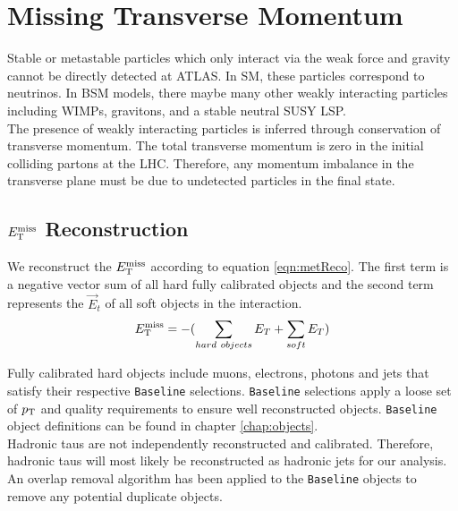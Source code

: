 \section{Missing Transverse Momentum}
\label{sec:reco:MET}

\indent Stable or metastable particles which only interact via the weak force and gravity cannot be directly detected at ATLAS.  In SM, these particles correspond to neutrinos.  In BSM models, there maybe many other weakly interacting particles including WIMPs, gravitons, and a stable neutral SUSY LSP. \\

\indent The presence of weakly interacting particles is inferred through conservation of transverse momentum.  The total transverse momentum is zero in the initial colliding partons at the LHC.  Therefore, any momentum imbalance in the transverse plane must be due to undetected particles in the final state.  \\

\subsection{$E_{\mathrm{T}}^{\mathrm{miss}}$ Reconstruction}
\label{sec:MET:reco}

\indent We reconstruct the $E_{\mathrm{T}}^{\mathrm{miss}}$ according to equation \ref{eqn:metReco}.  The first term is a negative vector sum of all hard fully calibrated objects and the second term represents the $\vec{E}_t$ of all soft objects in the interaction.  \\

\begin{equation}
E_{\mathrm{T}}^{\mathrm{miss}} = - ( \sum_{hard~objects} E_T + \sum_{soft} E_T ) 
\label{eqn:metReco}
\end{equation}

\indent Fully calibrated hard objects include muons, electrons, photons and jets that satisfy their respective {\tt Baseline} selections.  {\tt Baseline} selections apply a loose set of $p_{\mathrm{T}}$ and quality requirements to ensure well reconstructed objects.  {\tt Baseline} object definitions can be found in chapter \ref{chap:objects}. \\

\indent Hadronic taus are not independently reconstructed and calibrated.  Therefore, hadronic taus will most likely be reconstructed as hadronic jets for our analysis.  An overlap removal algorithm has been applied to the {\tt Baseline} objects to remove any potential duplicate objects. \\

